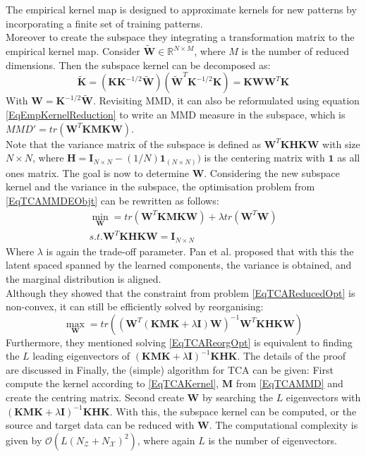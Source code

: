 The empirical kernel map is designed to approximate kernels for new patterns by incorporating a finite set of training patterns.\cite{Scholkopf.2001}\\
Moreover to create the subspace they integrating a transformation matrix to the empirical kernel map.
Consider $\tilde{\mathbf{W}} \in \mathbb{R}^{N\times M}$, where $M$ is the number of reduced dimensions.
Then the subspace kernel can be decomposed as:\cite{Pan.2011}
\begin{equation}\label{EqEmpKernelReduction}
	\tilde{\mathbf{K}} = (\mathbf{KK}^{-1/2}\tilde{\mathbf{W}})(\tilde{\mathbf{W}}^T\mathbf{K}^{-1/2} \mathbf{K}) = \mathbf{KWW}^T\mathbf{K}
\end{equation}
With $\mathbf{W} = \mathbf{K}^{-1/2}\tilde{\mathbf{W}}$.
Revisiting \acs{MMD}, it can also be reformulated using equation \eqref{EqEmpKernelReduction} to write an \acs{MMD} measure in the subspace, which is $MMD'= tr(\mathbf{W}^T\mathbf{KMKW})$.\\
Note that the variance matrix of the subspace is defined as $\mathbf{W}^T\mathbf{KHKW}$ with size $N \times N$, where $\mathbf{H} = \mathbf{I}_{N\times N} - (1/N)\mathbf{1}_{(N\times N)})$ is the centering matrix with $\mathbf{1}$ as all ones matrix.
The goal is now to determine $\mathbf{W}$.
Considering the new subspace kernel and the variance in the subspace, the optimisation problem from \eqref{EqTCAMMDEObjt} can be rewritten as follows:\cite{Pan.2011}
\begin{equation}\label{EqTCAReducedOpt}
	\begin{gathered}
		\min_{\mathbf{W}} = tr(\mathbf{W}^T\mathbf{KMKW}) + \lambda tr(\mathbf{W}^T\mathbf{W})\\
		s.t. \mathbf{W}^T\mathbf{KHKW} = \mathbf{I}_{N \times N}
	\end{gathered}
\end{equation}
Where $\lambda$ is again the trade-off parameter.
Pan et al. proposed that with this the latent spaced spanned by the learned components, the variance is obtained, and the marginal distribution is aligned.\\
Although they showed that the constraint from problem \eqref{EqTCAReducedOpt} is non-convex, it can still be efficiently solved by reorganising:\cite{Pan.2011}
\begin{equation}\label{EqTCAReorgOpt}
	\max_{\mathbf{W}} = tr((\mathbf{W}^T(\mathbf{KMK}+\lambda \mathbf{I})\mathbf{W})^{-1} \mathbf{W}^T\mathbf{KHKW})
\end{equation}
Furthermore, they mentioned solving \eqref{EqTCAReorgOpt} is equivalent to finding the $L$ leading eigenvectors of $(\mathbf{KMK}+\lambda \mathbf{I})^{-1} \mathbf{KHK}$.
The details of the proof are discussed in \cite{Pan.2011}
Finally, the (simple) algorithm for \acs{TCA} can be given:
First compute the kernel according to \eqref{EqTCAKernel}, $\mathbf{M}$ from \eqref{EqTCAMMD} and create the centring matrix.
Second create $\mathbf{W}$ by searching the $L$ eigenvectors with $(\mathbf{KMK}+\lambda \mathbf{I})^{-1} \mathbf{KHK}$.
With this, the subspace kernel can be computed, or the source and target data can be reduced with $\mathbf{W}$.
The computational complexity is given by $\mathcal{O}(L(N_\mathcal{Z}+N_\mathcal{X})^2)$, where again $L$ is the number of eigenvectors.\cite{Pan.2011}
